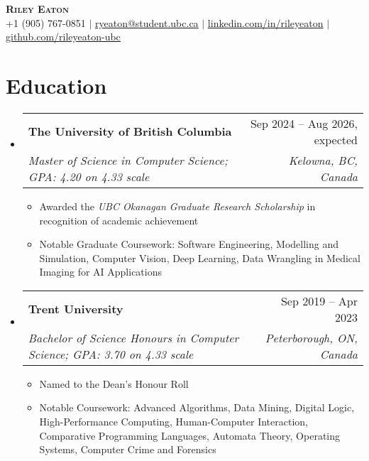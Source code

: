 \documentclass[letterpaper,11.5pt]{article}
\makeatletter
\newcommand{\resumeItem}[1]{
  \item\small{
    {#1 \vspace{-2pt}}
  }
}
\newcommand{\resumeSubheading}[4]{
  \vspace{-2pt}\item
    \begin{tabular*}{0.97\textwidth}[t]{l@{\extracolsep{\fill}}r}
      \textbf{#1} & #2 \\
      \textit{\small#3} & \textit{\small #4} \\
    \end{tabular*}\vspace{-7pt}
}
\newcommand{\resumeSubHeadingListStart}{\begin{itemize}[leftmargin=0.15in, label={}]}
\newcommand{\resumeSubHeadingListEnd}{\end{itemize}}
\newcommand{\resumeItemListStart}{\begin{itemize}}
\newcommand{\resumeItemListEnd}{\end{itemize}\vspace{-5pt}}
\def\iconSpace{0.5pt}
\makeatother
\begin{document}
\begin{center}
    \textbf{\Huge \scshape Riley Eaton} \\ \vspace{2pt}
    \small \faPhoneSquare \hspace{\iconSpace} +1 (905) 767-0851
    $|$ \faEnvelope \hspace{\iconSpace} \underline{\href{mailto:ryeaton@student.ubc.ca}{ryeaton@student.ubc.ca}}
    $|$ \faLinkedinSquare \hspace{\iconSpace} \underline{\href{https://linkedin.com/in/rileyeaton}{linkedin.com/in/rileyeaton}}
    $|$ \faGithub \hspace{\iconSpace} \underline{\href{https://github.com/rileyeaton-ubc}{github.com/rileyeaton-ubc}}
\end{center}

\section{Education}
  \resumeSubHeadingListStart
    \resumeSubheading
      {The University of British Columbia}{Sep 2024 -- Aug 2026, expected}
      {Master of Science in Computer Science; GPA: 4.20 on 4.33 scale}{Kelowna, BC, Canada}
      \resumeItemListStart
        \resumeItem{Awarded the \emph{UBC Okanagan Graduate Research Scholarship} in recognition of academic achievement}
        \resumeItem{Notable Graduate Coursework: Software Engineering, Modelling and Simulation, Computer Vision, Deep Learning, Data Wrangling in Medical Imaging for AI Applications}
      \resumeItemListEnd
    \resumeSubheading
      {Trent University}{Sep 2019 -- Apr 2023}
      {Bachelor of Science Honours in Computer Science; GPA: 3.70 on 4.33 scale}{Peterborough, ON, Canada}
      \resumeItemListStart
        \resumeItem{Named to the Dean's Honour Roll}
        \resumeItem{Notable Coursework: Advanced Algorithms, Data Mining, Digital Logic, High-Performance Computing, Human-Computer Interaction, Comparative Programming Languages, Automata Theory, Operating Systems, Computer Crime and Forensics}
      \resumeItemListEnd
  \resumeSubHeadingListEnd

\end{document}
